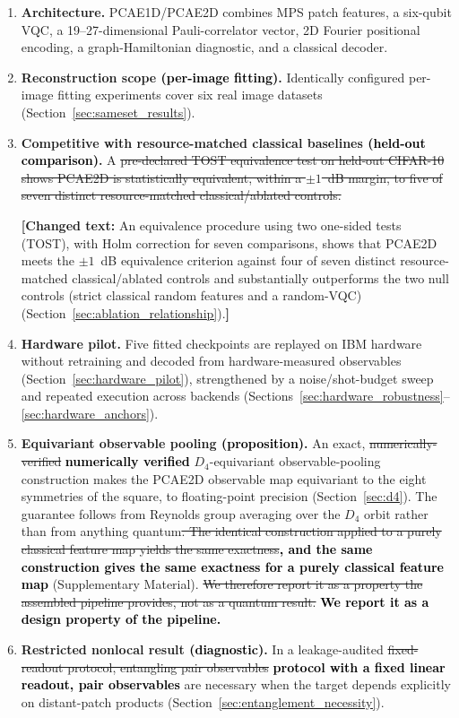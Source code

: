 \documentclass[pdflatex,sn-basic]{sn-jnl}
\newcommand{\del}[1]{\sout{#1}}
\newcommand{\add}[1]{\textbf{\textcolor{black}{#1}}}
\newcommand{\yellowchange}[1]{%
  \par\smallskip\noindent
  \begingroup\setlength{\fboxsep}{3pt}%
  \colorbox{yellow!35}{\parbox{\dimexpr\linewidth-2\fboxsep\relax}{\textbf{[Changed text:} #1\textbf{]}}}%
  \endgroup\par\smallskip}
\begin{document}
\begin{enumerate}\itemsep3pt
  \item \textbf{Architecture.} PCAE1D/PCAE2D combines MPS patch features, a
        six-qubit VQC, a 19--27-dimensional Pauli-correlator vector, 2D Fourier
        positional encoding, a graph-Hamiltonian diagnostic, and a classical
        decoder.
  \item \textbf{Reconstruction scope \add{(per-image fitting)}.} Identically configured per-image fitting
        experiments cover six real image datasets
        (Section~\ref{sec:sameset_results}).
  \item \textbf{Competitive with resource-matched classical baselines \add{(held-out comparison)}.} A
        \del{pre-declared TOST equivalence test on held-out CIFAR-10 shows
        PCAE2D is statistically equivalent, within a $\pm1$~dB margin, to five
        of seven distinct resource-matched classical/ablated controls.}
        \yellowchange{An equivalence procedure using two one-sided tests (TOST),
        with Holm correction for seven comparisons, shows that PCAE2D meets the
        $\pm1$~dB equivalence criterion against four of seven distinct
        resource-matched classical/ablated controls and substantially
        outperforms the two null controls (strict classical random features and
        a random-VQC) (Section~\ref{sec:ablation_relationship}).}
  \item \textbf{Hardware pilot.} Five fitted checkpoints are replayed on IBM
        hardware without retraining and decoded from hardware-measured
        observables (Section~\ref{sec:hardware_pilot}), strengthened by a
        noise/shot-budget sweep and repeated execution across backends
        (Sections~\ref{sec:hardware_robustness}--\ref{sec:hardware_anchors}).
  \item \textbf{Equivariant observable pooling \add{(proposition)}.} An exact,
        \del{numerically-verified} \add{numerically verified} $D_4$-equivariant observable-pooling construction
        makes the PCAE2D observable map equivariant to the eight symmetries of
        the square, to floating-point precision (Section~\ref{sec:d4}). The
        guarantee follows from Reynolds group averaging over the $D_4$ orbit
        rather than from anything quantum\del{. The identical construction applied to
        a purely classical feature map yields the same exactness}\add{, and the same
        construction gives the same exactness for a purely classical feature
        map} (Supplementary
        Material). \del{We therefore report it as a property the assembled pipeline
        provides, not as a quantum result.} \add{We report it as a design property
        of the pipeline.}
  \item \textbf{Restricted nonlocal result \add{(diagnostic)}.} In a leakage-audited \del{fixed-readout
        protocol, entangling pair observables} \add{protocol with a fixed
        linear readout, pair observables} are necessary when the target
        depends explicitly on distant-patch products
        (Section~\ref{sec:entanglement_necessity}).
\end{enumerate}
\end{document}

